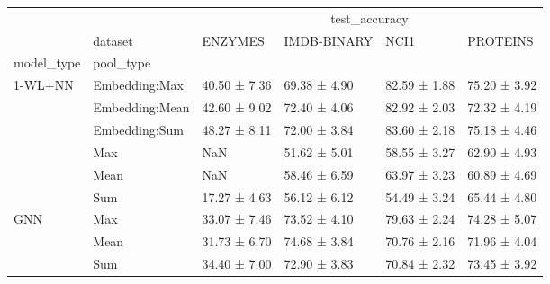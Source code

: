 \begin{tabular}{llllll}
\toprule
 &  & \multicolumn{4}{c}{test\_accuracy} \\
 & dataset & ENZYMES & IMDB-BINARY & NCI1 & PROTEINS \\
model_type & pool_type &  &  &  &  \\
\midrule
\multirow[t]{6}{*}{1-WL+NN} & Embedding:Max & 40.50 ± 7.36 & 69.38 ± 4.90 & 82.59 ± 1.88 & 75.20 ± 3.92 \\
 & Embedding:Mean & 42.60 ± 9.02 & 72.40 ± 4.06 & 82.92 ± 2.03 & 72.32 ± 4.19 \\
 & Embedding:Sum & 48.27 ± 8.11 & 72.00 ± 3.84 & 83.60 ± 2.18 & 75.18 ± 4.46 \\
 & Max & NaN & 51.62 ± 5.01 & 58.55 ± 3.27 & 62.90 ± 4.93 \\
 & Mean & NaN & 58.46 ± 6.59 & 63.97 ± 3.23 & 60.89 ± 4.69 \\
 & Sum & 17.27 ± 4.63 & 56.12 ± 6.12 & 54.49 ± 3.24 & 65.44 ± 4.80 \\
\cline{1-6}
\multirow[t]{3}{*}{GNN} & Max & 33.07 ± 7.46 & 73.52 ± 4.10 & 79.63 ± 2.24 & 74.28 ± 5.07 \\
 & Mean & 31.73 ± 6.70 & 74.68 ± 3.84 & 70.76 ± 2.16 & 71.96 ± 4.04 \\
 & Sum & 34.40 ± 7.00 & 72.90 ± 3.83 & 70.84 ± 2.32 & 73.45 ± 3.92 \\
\cline{1-6}
\bottomrule
\end{tabular}

